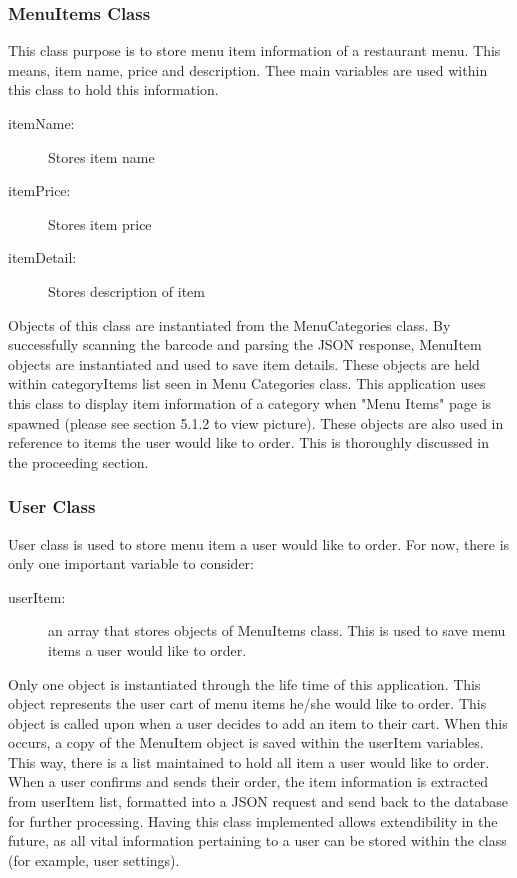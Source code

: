 \documentclass[12pt, titlepage]{article}
\begin{document}
\subsubsection{MenuItems Class}
This class purpose is to store menu item information of a restaurant menu. This means, item name, price and description. Thee main variables are used within this class to hold this information.

\begin{description}
  \item[itemName:] Stores item name
  \item[itemPrice:] Stores item price
  \item[itemDetail:] Stores description of item
\end{description}

Objects of this class are instantiated from the MenuCategories class. By successfully scanning the barcode and parsing the JSON response, MenuItem objects are instantiated and used to save item details. These objects are held within categoryItems list seen in Menu Categories class. This application uses this class to display item information of a category when "Menu Items" page is spawned (please see section 5.1.2 to view picture). These objects are also used in reference to items the user would like to order. This is thoroughly discussed in the proceeding section.  

\subsubsection{User Class}
User class is used to store menu item a user would like to order. For now, there is only one important variable to consider: 

 \begin{description}
  \item[userItem:] an array that stores objects of MenuItems class. This is used to save menu items a user would like to order.
\end{description}

Only one object is instantiated through the life time of this application. This object represents the user cart of menu items he/she would like to order. This object is called upon when a user decides to add an item to their cart. When this occurs, a copy of the MenuItem object is saved within the userItem variables. This way, there is a list maintained to hold all item a user would like to order. When a user confirms and sends their order, the item information is extracted from userItem list, formatted into a JSON request and send back to the database for further processing. Having this class implemented allows extendibility in the future, as all vital information pertaining to a user can be stored within the class (for example, user settings).  
\end{document}
